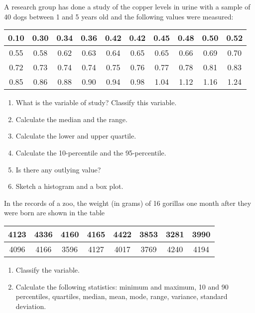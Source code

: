 \begin{problem}
 A research group has done a study of the copper levels in urine with
 a sample of 40 dogs between 1 and 5 years old and  the following
 values were measured:  

 \begin{center}
   \begin{tabular}{|*{10}{c|}}
  \hline    0.10 & 0.30 & 0.34 & 0.36 & 0.42 & 0.42 & 0.45 & 0.48 & 0.50 & 0.52 \\
\hline     0.55 & 0.58 & 0.62 & 0.63 & 0.64 & 0.65 & 0.65 & 0.66 &0.69 & 0.70 \\
\hline   0.72 & 0.73 & 0.74 & 0.74 & 0.75 & 0.76 &0.77 & 0.78 & 0.81 &0.83 \\
\hline   0.85 & 0.86 & 0.88 & 0.90 & 0.94 & 0.98 & 1.04 & 1.12 &1.16
&1.24  \\
\hline 
   \end{tabular}
 \end{center}
 \begin{enumerate} \renewcommand{\theenumi}{\alph{enumi}}
 \item What is the variable of  study? Classify this variable. 
 \item Calculate the median and the range. 
 \item Calculate the lower and upper quartile. 
  \item Calculate the 10-percentile and the 95-percentile.
  \item Is there any outlying value?
  \item Sketch a histogram and a box plot. 
 \end{enumerate}
\end{problem}


\begin{problem}
  In the records of a  zoo, the weight (in grams) of 16 gorillas one month after they were born are shown in the table 
  \begin{center}
    \begin{tabular}{|*{8}{c|}}
      \hline 4123 & 4336 & 4160 & 4165 & 4422 & 3853 & 3281 & 3990 \\
     \hline  4096 & 4166 & 3596 & 4127 & 4017 & 3769 & 4240 & 4194 \\
\hline
    \end{tabular}
  \end{center}
  \begin{enumerate}
  \item Classify the variable. 
  \item Calculate the following statistics: minimum and maximum, 10 and 90 percentiles, quartiles, median, mean, mode, range, variance, standard deviation. 
  \end{enumerate}
\end{problem}